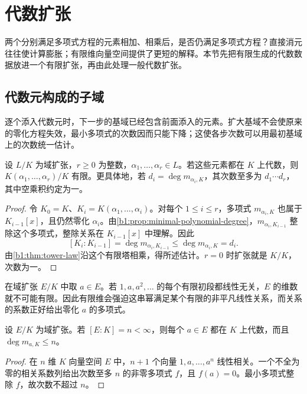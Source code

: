 
\section{代数扩张}
\label{b1:sec:1402}


%
%

两个分别满足多项式方程的元素相加、相乘后，是否仍满足多项式方程？直接消元往往使计算膨胀；有限维向量空间提供了更短的解释。本节先把有限生成的代数数据放进一个有限扩张，再由此处理一般代数扩张。

\subsection{代数元构成的子域}
\label{b1:subsec:1402:01}

逐个添入代数元时，下一步的基域已经包含前面添入的元素。扩大基域不会使原来的零化方程失效，最小多项式的次数因而只能下降；这使各步次数可以用最初基域上的次数统一估计。

\begin{lemma}\label{b1:lem:finite-algebraic-generators}
	设 \(L/K\) 为域扩张，\(r\geq0\) 为整数，\(\alpha_1,\ldots,\alpha_r\in L\)。若这些元素都在 \(K\) 上代数，则 \(K(\alpha_1,\ldots,\alpha_r)/K\) 有限。更具体地，若 \(d_i=\deg m_{\alpha_i,K}\)，其次数至多为 \(d_1\cdots d_r\)，其中空乘积约定为一。
\end{lemma}
\begin{proof}
	令 \(K_0=K\)、\(K_i=K(\alpha_1,\ldots,\alpha_i)\)。对每个 \(1\leq i\leq r\)，多项式 \(m_{\alpha_i,K}\) 也属于 \(K_{i-1}[x]\)，且仍然零化 \(\alpha_i\)。由\cref{b1:prop:minimal-polynomial-degree}，\(m_{\alpha_i,K_{i-1}}\) 整除这个多项式，整除关系在 \(K_{i-1}[x]\) 中理解。因此
	\[
		[K_i:K_{i-1}] =\deg m_{\alpha_i,K_{i-1}} \leq\deg m_{\alpha_i,K}=d_i.
	\]
	由\cref{b1:thm:tower-law}沿这个有限塔相乘，得所述估计。\(r=0\) 时扩张就是 \(K/K\)，次数为一。
\end{proof}

在域扩张 \(E/K\) 中取 \(a\in E\)。若 \(1,a,a^2,\ldots\) 的每个有限初段都线性无关，\(E\) 的维数就不可能有限。因此有限维会强迫这串幂满足某个有限的非平凡线性关系，而关系的系数正好给出零化 \(a\) 的多项式。

\begin{lemma}\label{b1:lem:finite-dimensional-algebraic}
	设 \(E/K\) 为域扩张。若 \([E:K]=n<\infty\)，则每个 \(a\in E\) 都在 \(K\) 上代数，而且 \(\deg m_{a,K}\leq n\)。
\end{lemma}
\begin{proof}
	在 \(n\) 维 \(K\) 向量空间 \(E\) 中，\(n+1\) 个向量 \(1,a,\ldots,a^n\) 线性相关。一个不全为零的相关系数列给出次数至多 \(n\) 的非零多项式 \(f\)，且 \(f(a)=0\)。最小多项式整除 \(f\)，故次数不超过 \(n\)。
\end{proof}

